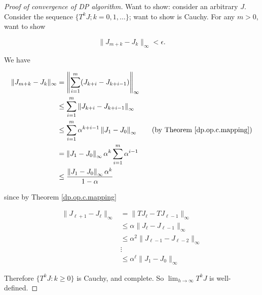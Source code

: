%
%
%


\begin{proof}[Proof of convergence of DP algorithm]

Want to show: consider an arbitrary \(J\). Consider the sequence \(\{T^kJ; k =0,1, \ldots\}\); want to show is Cauchy. For any \(m > 0\), want to show

\[
\lVert J_{m+k} - J_k \rVert_\infty < \epsilon.
\]

We have

\begin{align*}
\lVert J_{m+k} - J_k \rVert_\infty & = \left\lVert  \sum_{i=1}^m( J_{k+i} - J_{k+i-1} )\right\rVert_\infty
\\ & \leq  \sum_{i=1}^m \left\lVert J_{k+i} - J_{k+i-1} \right\rVert_\infty
\\ & \leq  \sum_{i=1}^m \alpha^{k+i-1}  \left\lVert J_{1} - J_{0} \right\rVert_\infty \qquad \text{(by Theorem \ref{dp.op.c.mapping})} 
\\ & =  \left\lVert  J_{1} - J_{0} \right\rVert_\infty \alpha^k  \sum_{i=1}^m \alpha^{i-1}  
\\ & \leq \frac{\left\lVert  J_{1} - J_{0} \right\rVert_\infty\alpha^k }{1 - \alpha}
\end{align*}

since by Theorem \ref{dp.op.c.mapping}

\begin{align*}
\lVert J_{\ell + 1} - J_\ell \rVert_\infty & = \lVert TJ_{\ell} -T J_{\ell - 1} \rVert_\infty
\\ & \leq \alpha \lVert J_\ell - J_{\ell - 1} \rVert_\infty
\\ & \leq \alpha^2 \lVert J_{\ell - 1} - J_{\ell - 2} \rVert_\infty
\\ & \vdots
\\ & \leq \alpha^\ell \lVert J_{1} - J_{0} \rVert_\infty
\end{align*}

Therefore \(\{T^k J: k \geq 0\}\) is Cauchy, and complete. So \(\lim_{h \to \infty} T^kJ\) is well-defined. 



\end{proof}

